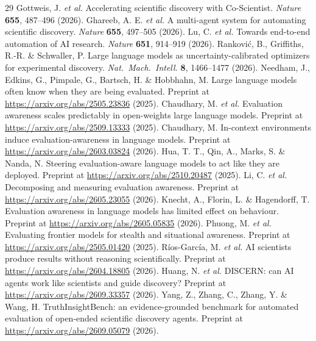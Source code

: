 \documentclass[11pt]{article}
\begin{document}
\clearpage
\begin{thebibliography}{29}
\small
{} Gottweis, J. \emph{et al.} Accelerating scientific discovery with Co-Scientist. \emph{Nature} \textbf{655}, 487--496 (2026).
 Ghareeb, A. E. \emph{et al.} A multi-agent system for automating scientific discovery. \emph{Nature} \textbf{655}, 497--505 (2026).
 Lu, C. \emph{et al.} Towards end-to-end automation of AI research. \emph{Nature} \textbf{651}, 914--919 (2026).
 Rankovi\'{c}, B., Griffiths, R.-R. \& Schwaller, P. Large language models as uncertainty-calibrated optimizers for experimental discovery. \emph{Nat.\ Mach.\ Intell.} \textbf{8}, 1466--1477 (2026).
 Needham, J., Edkins, G., Pimpale, G., Bartsch, H. \& Hobbhahn, M. Large language models often know when they are being evaluated. Preprint at \url{https://arxiv.org/abs/2505.23836} (2025).
 Chaudhary, M. \emph{et al.} Evaluation awareness scales predictably in open-weights large language models. Preprint at \url{https://arxiv.org/abs/2509.13333} (2025).
 Chaudhary, M. In-context environments induce evaluation-awareness in language models. Preprint at \url{https://arxiv.org/abs/2603.03824} (2026).
 Hua, T. T., Qin, A., Marks, S. \& Nanda, N. Steering evaluation-aware language models to act like they are deployed. Preprint at \url{https://arxiv.org/abs/2510.20487} (2025).
 Li, C. \emph{et al.} Decomposing and measuring evaluation awareness. Preprint at \url{https://arxiv.org/abs/2605.23055} (2026).
 Knecht, A., Florin, L. \& Hagendorff, T. Evaluation awareness in language models has limited effect on behaviour. Preprint at \url{https://arxiv.org/abs/2605.05835} (2026).
 Phuong, M. \emph{et al.} Evaluating frontier models for stealth and situational awareness. Preprint at \url{https://arxiv.org/abs/2505.01420} (2025).
 R\'{i}os-Garc\'{i}a, M. \emph{et al.} AI scientists produce results without reasoning scientifically. Preprint at \url{https://arxiv.org/abs/2604.18805} (2026).
 Huang, N. \emph{et al.} DISCERN: can AI agents work like scientists and guide discovery? Preprint at \url{https://arxiv.org/abs/2609.33357} (2026).
 Yang, Z., Zhang, C., Zhang, Y. \& Wang, H. TruthInsightBench: an evidence-grounded benchmark for automated evaluation of open-ended scientific discovery agents. Preprint at \url{https://arxiv.org/abs/2609.05079} (2026).

\end{thebibliography}
\end{document}
